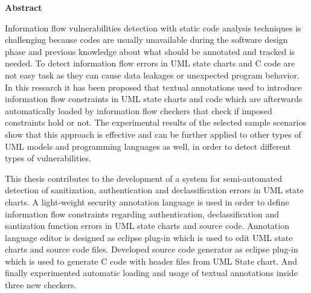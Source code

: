 

\clearemptydoublepage
{}
{}	





\vspace*{2cm}
\begin{center}
{\Large \bf Abstract}
\end{center}
\vspace{1cm}

Information flow vulnerabilities detection with static code analysis techniques is challenging because codes are usually unavailable during  the software design phase and
previous knowledge about what should be annotated and tracked
is needed. To detect information flow errors in UML state
charts and C code are not easy task as they can cause data leakages or unexpected program behavior. In this research it has been proposed that textual annotations used to
introduce information flow constraints in UML state charts and code which are afterwards automatically loaded by information flow checkers that check if imposed constraints hold or not. The experimental results of the selected sample scenarios show that this approach
is effective and can be further applied to other types of UML
models and programming languages as well, in order to detect
different types of vulnerabilities.

This thesis contributes to the development of a system for semi-automated detection of sanitization, authentication and declassification errors in UML state charts. A light-weight security annotation language is used in order to define information flow constraints regarding authentication, declassification and santization function errors  in UML state charts and source code. Annotation language editor is designed as eclipse
plug-in which is used to edit UML state charts and
source code files. Developed source code generator as eclipse plug-in which is used to generate C code with header files from UML State chart. And finally experimented automatic loading and usage of textual annotations inside three new checkers.